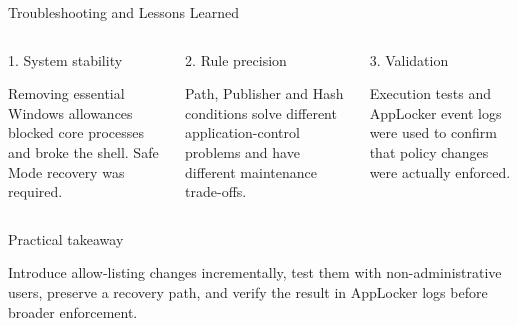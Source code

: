 \documentclass[aspectratio=169,10pt]{beamer}
\newcommand{\boxtext}[4][SoftGrey]{%
	\begingroup
	\setlength{\fboxsep}{7pt}%
	\colorbox{#1}{%
		\parbox{\dimexpr\linewidth-2\fboxsep\relax}{%
\RaggedRight
			{\color{#2}\large #3}
			\par
			\vspace{0.07cm}
			{\small #4}%
		}%
	}%
	\endgroup
}
\begin{document}
	\begin{frame}{Troubleshooting and Lessons Learned}
		
		\begin{columns}[T,onlytextwidth]
			
			
			\boxtext[SoftOrange]
			{PortfolioOrange}
			{1. System stability}
			{
				Removing essential Windows allowances blocked core
				processes and broke the shell. Safe Mode recovery
				was required.
			}
			
			
			\boxtext[SoftBlue]
			{PortfolioBlue}
			{2. Rule precision}
			{
				Path, Publisher and Hash conditions solve different
				application-control problems and have different
				maintenance trade-offs.
			}
			
			
			\boxtext[SoftTeal]
			{PortfolioTeal}
			{3. Validation}
			{
				Execution tests and AppLocker event logs were used
				to confirm that policy changes were actually enforced.
			}
			
		\end{columns}
		
		\vspace{0.28cm}
		
		\boxtext[SoftGrey]
		{PortfolioTeal}
		{Practical takeaway}
		{
			Introduce allow-listing changes incrementally, test them
			with non-administrative users, preserve a recovery path,
			and verify the result in AppLocker logs before broader
			enforcement.
		}
		
	\end{frame}
	
\end{document}
